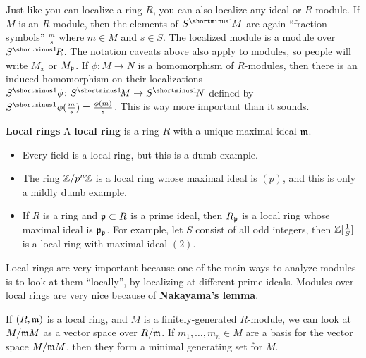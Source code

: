 Just like you can localize a ring $R$, you can also localize any ideal or $R$-module. If $M$ is an $R$-module, then the elements of $S\linv M$ are again ``fraction symbols'' $\frac{m}{s}$ where $m \in M$ and $s \in S$. The localized module is a module over $S\linv R$. The notation caveats above also apply to modules, so people will write $M_x$ or $M_{\mathfrak{p}}$. If $\phi \colon M \to N$ is a homomorphism of $R$-modules, then there is an induced homomorphism on their localizations $S\inv \phi \colon S\linv M \to S\linv N$ defined by $S\inv \phi(\frac{m}{s}) = \frac{\phi(m)}{s}$. This is way more important than it sounds.

\noindent \textbf{Local rings}
A \textbf{local ring} is a ring $R$ with a unique maximal ideal $\mathfrak{m}$.
\begin{itemize}
    \item Every field is a local ring, but this is a dumb example.
    \item The ring $\mathbb{Z}/p^n \mathbb{Z}$ is a local ring whose maximal ideal is $(p)$, and this is only a mildly dumb example.
    \item If $R$ is a ring and $\mathfrak{p} \subset R$ is a prime ideal, then $R_{\mathfrak{p}}$ is a local ring whose maximal ideal is $\mathfrak{p}_{\mathfrak{p}}$. For example, let $S$ consist of all odd integers, then $\mathbb{Z}[\frac{1}{S}]$ is a local ring with maximal ideal $(2)$.
\end{itemize}
Local rings are very important because one of the main ways to analyze modules is to look at them ``locally'', by localizing at different prime ideals. Modules over local rings are very nice because of \textbf{Nakayama's lemma}.
\begin{thm}
If $(R,\mathfrak{m})$ is a local ring, and $M$ is a finitely-generated $R$-module, we can look at $M/\mathfrak{m}M$ as a vector space over $R/\mathfrak{m}$. If $m_1,\dots,m_n \in M$ are a basis for the vector space $M/\mathfrak{m}M$, then they form a minimal generating set for $M$.
\end{thm}